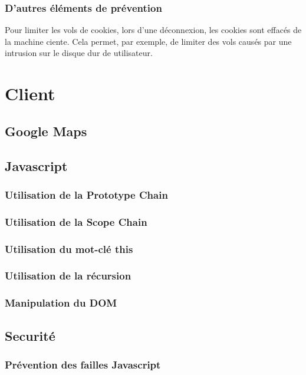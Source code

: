\documentclass[a4paper]{article}
\begin{document}
		\subsubsection{D'autres éléments de prévention}
		
Pour limiter les vols de cookies, lors d'une déconnexion, les cookies sont effacés de la machine ciente.
Cela permet, par exemple, de limiter des vols causés par une intrusion sur le disque dur de utilisateur.
 		
\section{Client}

	\subsection{Google Maps}
	\subsection{Javascript} 
		\subsubsection{Utilisation de la Prototype Chain}
		\subsubsection{Utilisation de la Scope Chain}
		\subsubsection{Utilisation du mot-clé this}
		\subsubsection{Utilisation de la récursion}
		\subsubsection{Manipulation du DOM}
   \subsection{Securité} 
  		\subsubsection{Prévention des failles Javascript}
\end{document}
